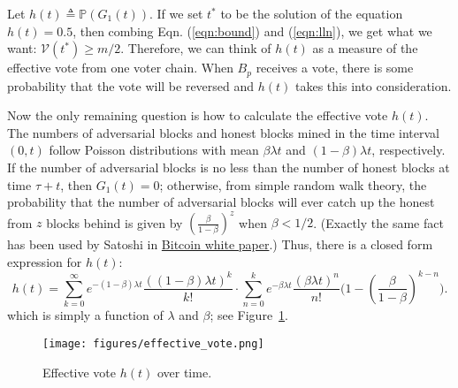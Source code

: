\documentclass{article}
\begin{document}
Let $h(t) \triangleq \mathbb{P}(G_1(t))$. If we set $t^*$ to be the solution of the equation $h(t) = 0.5$, then combing Eqn. (\ref{eqn:bound}) and (\ref{eqn:lln}), we get what we want: $\mathcal{V}(t^*) \geq m/2$.  Therefore, we can think of $h(t)$ as a measure of the effective vote from one voter chain. When $B_p$ receives a vote, there is some probability that the vote will be reversed and $h(t)$ takes this into consideration.

Now the only remaining question is how to calculate the effective vote $h(t)$. The numbers of adversarial blocks and honest blocks mined in the time interval $(0, t)$ follow Poisson distributions with mean $\beta \lambda t$ and $(1-\beta)\lambda t$, respectively. If the number of adversarial blocks is no less than the number of honest blocks at time $\tau+t$, then $G_1(t) = 0$; otherwise, from simple random walk theory, the probability that the number of adversarial blocks will ever catch up the honest from $z$ blocks behind is given by $(\frac{\beta}{1-\beta})^z$ when $\beta < 1/2$. (Exactly the same fact has been used by Satoshi in \href{https://bitcoin.org/bitcoin.pdf}{Bitcoin white paper}.)  Thus, there is a closed form expression for $h(t)$: 
\begin{equation}
    h(t) =  \sum_{k = 0}^{\infty} e^{-(1-\beta)\lambda t} \frac{((1-\beta)\lambda t)^k}{k!} \cdot \sum_{n=0}^{k} e^{-\beta\lambda t} \frac{(\beta\lambda t)^n}{n!} \big (1-(\frac{\beta}{1-\beta})^{k-n} \big).
\end{equation}
which is simply a function of $\lambda$ and $\beta$; see Figure~\ref{fig:vote}. 


\begin{figure}
    \centering
    \texttt{[image: figures/effective\_vote.png]}
    \caption{Effective vote $h(t)$ over time.}
    \label{fig:vote}
\end{figure}
\end{document}
